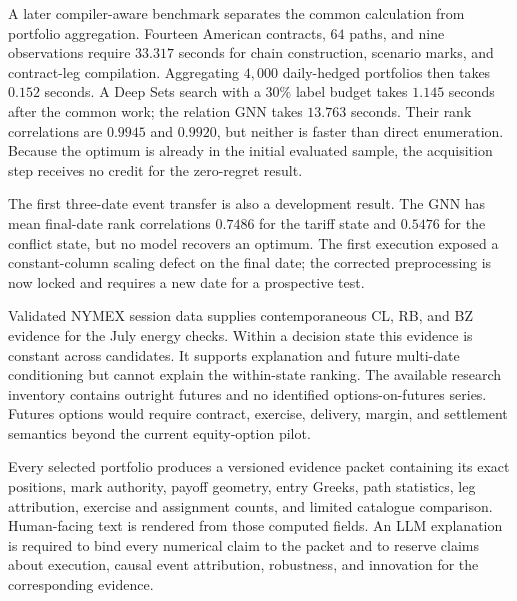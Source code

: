 \documentclass{strategynet-journal}
\begin{document}
A later compiler-aware benchmark separates the common calculation from
portfolio aggregation.  Fourteen American contracts, \(64\) paths, and nine
observations require \(33.317\) seconds for chain construction, scenario
marks, and contract-leg compilation.  Aggregating \(4{,}000\) daily-hedged
portfolios then takes \(0.152\) seconds.  A Deep Sets search with a \(30\%\)
label budget takes \(1.145\) seconds after the common work; the relation GNN
takes \(13.763\) seconds.  Their rank correlations are \(0.9945\) and
\(0.9920\), but neither is faster than direct enumeration.  Because the optimum
is already in the initial evaluated sample, the acquisition step receives no
credit for the zero-regret result.

The first three-date event transfer is also a development result.  The GNN
has mean final-date rank correlations \(0.7486\) for the tariff state and
\(0.5476\) for the conflict state, but no model recovers an optimum.  The
first execution exposed a constant-column scaling defect on the final date;
the corrected preprocessing is now locked and requires a new date for a
prospective test.

Validated NYMEX session data supplies contemporaneous CL, RB, and BZ evidence
for the July energy checks.  Within a decision state this evidence is constant
across candidates.  It supports explanation and future multi-date conditioning
but cannot explain the within-state ranking.  The
available research inventory contains outright futures and no identified
options-on-futures series.  Futures options would require contract,
exercise, delivery, margin, and settlement semantics beyond the current
equity-option pilot.

Every selected portfolio produces a versioned evidence packet containing its
exact positions, mark authority, payoff geometry, entry Greeks, path
statistics, leg attribution, exercise and assignment counts, and limited
catalogue comparison.  Human-facing text is rendered from those computed
fields.  An LLM explanation is required to bind every numerical claim to the
packet and to reserve claims about execution, causal event attribution,
robustness, and innovation for the corresponding evidence.
\end{document}
